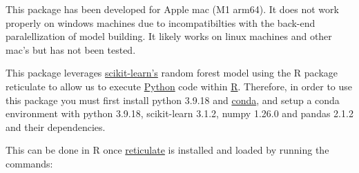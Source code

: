 \documentclass[
]{article}
\begin{document}
This package has been developed for Apple mac (M1 arm64). It does not
work properly on windows machines due to incompatibilties with the
back-end paralellization of model building. It likely works on linux
machines and other mac's but has not been tested.

This package leverages
\href{https://scikit-learn.org/stable/}{scikit-learn's} random forest
model using the R package reticulate to allow us to execute
\href{https://www.python.org/}{Python} code within
\href{https://www.r-project.org/about.html}{R}. Therefore, in order to
use this package you must first install python 3.9.18 and
\href{https://conda.io/projects/conda/en/latest/user-guide/install/index.html}{conda},
and setup a conda environment with python 3.9.18, scikit-learn 3.1.2,
numpy 1.26.0 and pandas 2.1.2 and their dependencies.

This can be done in R once
\href{https://rstudio.github.io/reticulate/}{reticulate} is installed
and loaded by running the commands:
\end{document}
